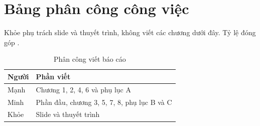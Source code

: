 \chapter*{Bảng phân công công việc}

Khỏe phụ trách slide và thuyết trình, không viết các chương dưới đây.
Tỷ lệ đóng góp .

\begin{table}[ht]
\centering
\caption{Phân công viết báo cáo}
\label{tab:phan-cong}
\begin{tabular}{ll}
\toprule
Người & Phần viết \\
\midrule
Mạnh & Chương 1, 2, 4, 6 và phụ lục A \\
Minh & Phần đầu, chương 3, 5, 7, 8, phụ lục B và C \\
Khỏe & Slide và thuyết trình \\
\bottomrule
\end{tabular}
\end{table}
